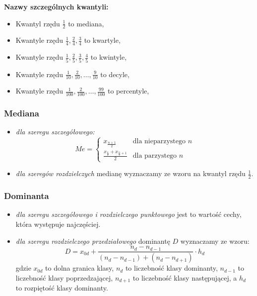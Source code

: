 \documentclass[../Matematyka.tex]{subfiles}
\begin{document}
{\bf Nazwy szczególnych kwantyli:}
\begin{itemize}
    \item Kwantyl rzędu \(\frac{1}{2}\) to mediana,
    \item Kwantyle rzędu \(\frac{1}{4}, \frac{2}{4}, \frac{3}{4}\) to kwartyle,
    \item Kwantyle rzędu \(\frac{1}{5}, \frac{2}{5}, \frac{3}{5}, \frac{4}{5}\) to kwintyle,
    \item Kwantyle rzędu \(\frac{1}{10}, \frac{2}{10}, \ldots, \frac{9}{10}\) to decyle,
    \item Kwantyle rzędu \(\frac{1}{100}, \frac{2}{100}, \ldots, \frac{99}{100}\) to percentyle,
\end{itemize}
\newpage
\subsubsection*{Mediana}
\begin{itemize}
    \item {\it dla szeregu szczegółowego:}
          \[Me =
              \begin{cases}
                  x_{\frac{n+1}{2}}                             & \text{dla nieparzystego } n \\
                  \frac{x_{\frac{n}{2}} + x_{\frac{n}{2}+1}}{2} & \text{dla parzystego } n
              \end{cases}\]
    \item {\it dla szeregów rozdzielczych} medianę wyznaczamy ze wzoru na kwantyl rzędu \(\frac{1}{2}\).
\end{itemize}
\subsubsection*{Dominanta}
\begin{itemize}
    \item {\it dla szeregu szczegółowego i rozdzielczego punktowego} jest to wartość cechy, która występuje najczęściej.
    \item {\it dla szeregu rozdzielczego przedziałowego} dominantę \(D\) wyznaczamy ze wzoru:
          \[D = x_{0d} + \frac{n_d - n_{d-1}}{(n_d - n_{d-1}) + (n_d - n_{d+1})} \cdot h_d\]
          gdzie \(x_{0d}\) to dolna granica klasy, \(n_d\) to liczebność klasy dominanty, \(n_{d-1}\) to liczebność klasy poprzedzającej, \(n_{d+1}\) to liczebność klasy następującej, a \(h_d\) to rozpiętość klasy dominanty.
\end{itemize}
\end{document}
